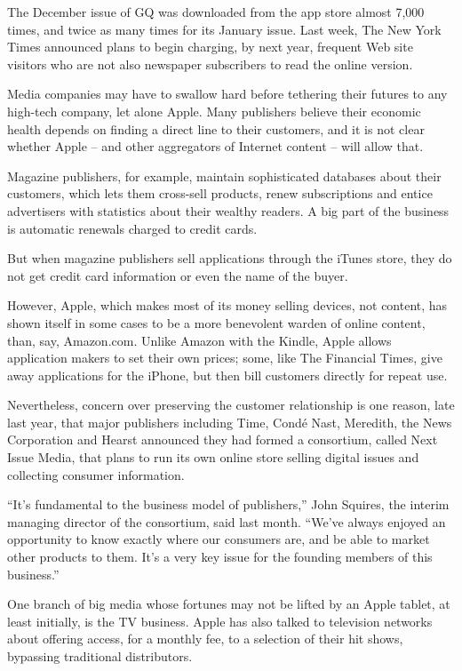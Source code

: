 ﻿\documentclass[12pt]{article}
\begin{document}
The December issue of GQ was downloaded from the app store almost 7,000 times, and twice as many
times for its January issue. Last week, The New York Times announced plans to begin charging, by
next year, frequent Web site visitors who are not also newspaper subscribers to read the online
version.

Media companies may have to swallow hard before tethering their futures to any high-tech company,
let alone Apple. Many publishers believe their economic health depends on finding a direct line to
their customers, and it is not clear whether Apple -- and other aggregators of Internet content --
will allow that.

Magazine publishers, for example, maintain sophisticated databases about their customers, which lets
them cross-sell products, renew subscriptions and entice advertisers with statistics about their
wealthy readers. A big part of the business is automatic renewals charged to credit cards.

But when magazine publishers sell applications through the iTunes store, they do not get credit card
information or even the name of the buyer.

However, Apple, which makes most of its money selling devices, not content, has shown itself in some
cases to be a more benevolent warden of online content, than, say, Amazon.com. Unlike Amazon with
the Kindle, Apple allows application makers to set their own prices; some, like The Financial Times,
give away applications for the iPhone, but then bill customers directly for repeat use.

Nevertheless, concern over preserving the customer relationship is one reason, late last year, that
major publishers including Time, Cond\'e Nast, Meredith, the News Corporation and Hearst announced
they had formed a consortium, called Next Issue Media, that plans to run its own online store
selling digital issues and collecting consumer information.

``It's fundamental to the business model of publishers,'' John Squires, the interim managing
director of the consortium, said last month. ``We've always enjoyed an opportunity to know exactly
where our consumers are, and be able to market other products to them. It's a very key issue for the
founding members of this business.''

One branch of big media whose fortunes may not be lifted by an Apple tablet, at least initially, is
the TV business. Apple has also talked to television networks about offering access, for a monthly
fee, to a selection of their hit shows, bypassing traditional distributors.
\end{document}

